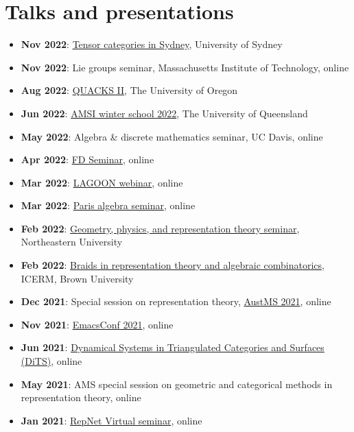 \documentclass[a4paper]{moderncv}
\begin{document}
\section{Talks and presentations}
\label{sec:org275f4fe}
\begin{itemize}
\item \textbf{Nov 2022}: \href{https://www.maths.usyd.edu.au/u/kevinc/TensorCat.html}{Tensor categories in Sydney}, University of Sydney
\item \textbf{Nov 2022}: Lie groups seminar, Massachusetts Institute of Technology, online
\item \textbf{Aug 2022}: \href{https://pages.uoregon.edu/belias/QUACKSII/index.html}{QUACKS II}, The University of Oregon
\item \textbf{Jun 2022}: \href{https://ws.amsi.org.au/}{AMSI winter school 2022}, The University of Queensland
\item \textbf{May 2022}: Algebra \& discrete mathematics seminar, UC Davis, online
\item \textbf{Apr 2022}: \href{https://www.fd-seminar.xyz/}{FD Seminar}, online
\item \textbf{Mar 2022}: \href{https://sites.google.com/view/lagoonwebinar/home}{LAGOON webinar}, online
\item \textbf{Mar 2022}: \href{https://www.imj-prg.fr/gestion/evenement/affEvenement/1}{Paris algebra seminar}, online
\item \textbf{Feb 2022}: \href{http://mathserver.neu.edu/\~robin/Seminars/GPRT/index.html}{Geometry, physics, and representation theory seminar}, Northeastern University
\item \textbf{Feb 2022}: \href{https://icerm.brown.edu/programs/sp-s22/w1/}{Braids in representation theory and algebraic combinatorics}, ICERM, Brown University
\item \textbf{Dec 2021}: Special session on representation theory, \href{https://austms.org.au/event/austms-2021/}{AustMS 2021}, online
\item \textbf{Nov 2021}: \href{https://emacsconf.org/2021/}{EmacsConf 2021}, online
\item \textbf{Jun 2021}: \href{https://sites.google.com/view/symposium-dits/}{Dynamical Systems in Triangulated Categories and Surfaces (DiTS)}, online
\item \textbf{May 2021}: AMS special session on geometric and categorical methods in representation theory, online
\item \textbf{Jan 2021}: \href{https://sites.google.com/view/repnetvirtualseminar/home}{RepNet Virtual seminar}, online

\end{itemize}
\end{document}
